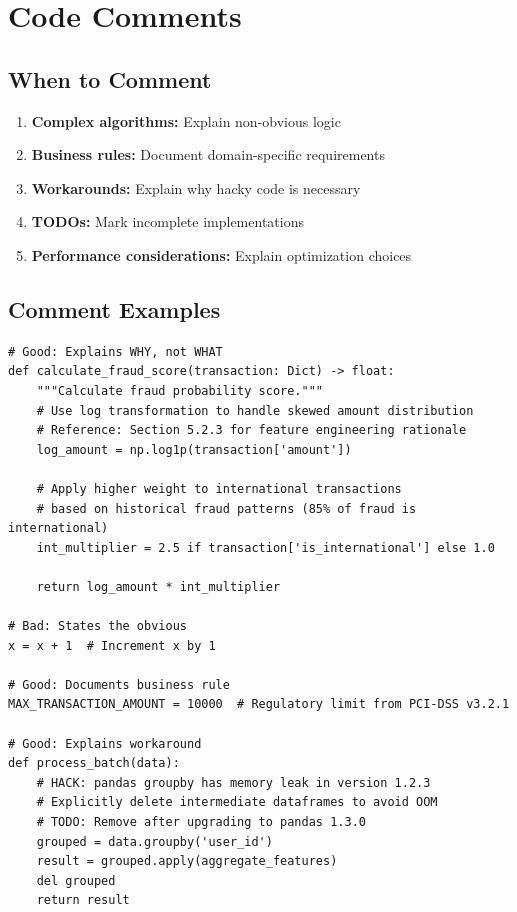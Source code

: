 \section{Code Comments}

\subsection{When to Comment}

\begin{enumerate}
    \item \textbf{Complex algorithms:} Explain non-obvious logic
    \item \textbf{Business rules:} Document domain-specific requirements
    \item \textbf{Workarounds:} Explain why hacky code is necessary
    \item \textbf{TODOs:} Mark incomplete implementations
    \item \textbf{Performance considerations:} Explain optimization choices
\end{enumerate}

\subsection{Comment Examples}

\begin{lstlisting}[style=python, caption=Good Comment Examples]
# Good: Explains WHY, not WHAT
def calculate_fraud_score(transaction: Dict) -> float:
    """Calculate fraud probability score."""
    # Use log transformation to handle skewed amount distribution
    # Reference: Section 5.2.3 for feature engineering rationale
    log_amount = np.log1p(transaction['amount'])

    # Apply higher weight to international transactions
    # based on historical fraud patterns (85% of fraud is international)
    int_multiplier = 2.5 if transaction['is_international'] else 1.0

    return log_amount * int_multiplier

# Bad: States the obvious
x = x + 1  # Increment x by 1

# Good: Documents business rule
MAX_TRANSACTION_AMOUNT = 10000  # Regulatory limit from PCI-DSS v3.2.1

# Good: Explains workaround
def process_batch(data):
    # HACK: pandas groupby has memory leak in version 1.2.3
    # Explicitly delete intermediate dataframes to avoid OOM
    # TODO: Remove after upgrading to pandas 1.3.0
    grouped = data.groupby('user_id')
    result = grouped.apply(aggregate_features)
    del grouped
    return result
\end{lstlisting}

